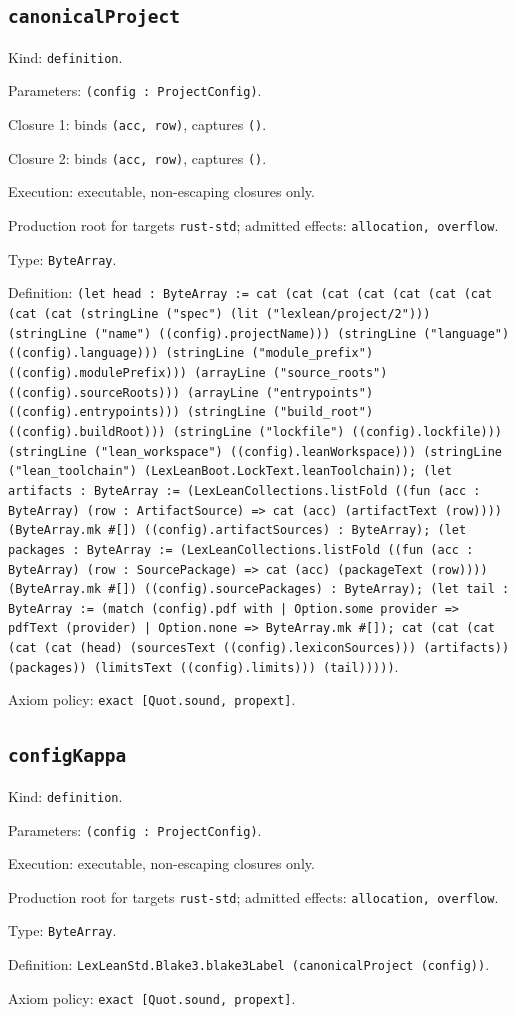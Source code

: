 \documentclass[11pt]{article}
\begin{document}
\subsection*{\texttt{canonicalProject}}
\noindent Kind: \texttt{definition}.\par
\noindent Parameters: \texttt{(config : ProjectConfig)}.\par
\noindent Closure 1: binds \texttt{(acc, row)}, captures \texttt{()}.\par
\noindent Closure 2: binds \texttt{(acc, row)}, captures \texttt{()}.\par
\noindent Execution: executable, non-escaping closures only.\par
\noindent Production root for targets \texttt{rust-std}; admitted effects: \texttt{allocation, overflow}.\par
\noindent Type: \texttt{ByteArray}.\par
\noindent Definition: \texttt{(let head : ByteArray := cat (cat (cat (cat (cat (cat (cat (cat (cat (stringLine ("spec") (lit ("lexlean/project/2"))) (stringLine ("name") ((config).projectName))) (stringLine ("language") ((config).language))) (stringLine ("module\_prefix") ((config).modulePrefix))) (arrayLine ("source\_roots") ((config).sourceRoots))) (arrayLine ("entrypoints") ((config).entrypoints))) (stringLine ("build\_root") ((config).buildRoot))) (stringLine ("lockfile") ((config).lockfile))) (stringLine ("lean\_workspace") ((config).leanWorkspace))) (stringLine ("lean\_toolchain") (LexLeanBoot.LockText.leanToolchain)); (let artifacts : ByteArray := (LexLeanCollections.listFold ((fun (acc : ByteArray) (row : ArtifactSource) => cat (acc) (artifactText (row)))) (ByteArray.mk \#[]) ((config).artifactSources) : ByteArray); (let packages : ByteArray := (LexLeanCollections.listFold ((fun (acc : ByteArray) (row : SourcePackage) => cat (acc) (packageText (row)))) (ByteArray.mk \#[]) ((config).sourcePackages) : ByteArray); (let tail : ByteArray := (match (config).pdf with | Option.some provider => pdfText (provider) | Option.none => ByteArray.mk \#[]); cat (cat (cat (cat (cat (head) (sourcesText ((config).lexiconSources))) (artifacts)) (packages)) (limitsText ((config).limits))) (tail)))))}.\par
\noindent Axiom policy: \texttt{exact [Quot.sound, propext]}.\par
\subsection*{\texttt{configKappa}}
\noindent Kind: \texttt{definition}.\par
\noindent Parameters: \texttt{(config : ProjectConfig)}.\par
\noindent Execution: executable, non-escaping closures only.\par
\noindent Production root for targets \texttt{rust-std}; admitted effects: \texttt{allocation, overflow}.\par
\noindent Type: \texttt{ByteArray}.\par
\noindent Definition: \texttt{LexLeanStd.Blake3.blake3Label (canonicalProject (config))}.\par
\noindent Axiom policy: \texttt{exact [Quot.sound, propext]}.\par
\end{document}
